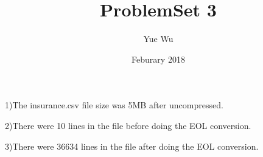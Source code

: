 \documentclass{article}
\title{ProblemSet 3}
\author{Yue Wu}
\date{Feburary 2018}
\begin{document}
\maketitle


1)The insurance.csv file size was 5MB after uncompressed.

2)There were 10 lines in the file before doing the EOL conversion.

3)There were 36634 lines in the file after doing the EOL conversion.
\end{document}
